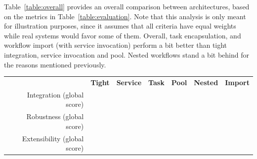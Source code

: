 \documentclass[preprint,3p,twocolumn]{elsarticle}
\newcommand{\note}[2]{\pdfmargincomment[color=yellow,author=#1,open=true]{#2}}
\newcommand{\closednote}[4]{} %
\begin{document}
Table~\ref{table:overall} provides an overall comparison between
architectures, based on the metrics in Table~\ref{table:evaluation}.
Note that this analysis is only meant for illustration purposes, since it
assumes that all criteria have equal weights while real systems would
favor some of them. Overall, task encapsulation, and workflow import (with
service invocation) perform a bit better than tight integration,
service invocation and pool. Nested workflows stand a bit behind for
the reasons mentioned previously.\closednote{Rafael}{I would emphasize
  that this analysis is only for illustration purposes, since it does
  not account for different weights in metrics.}{Tristan}{Done.}
\begin{table}
\footnotesize
\centering
\begin{tabular}{rcccccc}
                                    & \textbf{Tight}
                                    & \textbf{Service}
                                    & \textbf{Task}
                                    & \textbf{Pool}
                                    & \textbf{Nested}
                                    & \textbf{Import} \\
  Integration (global score)    &
                                    \cellcolor[HTML]{99FF99}{0.00}
                                    & \cellcolor[HTML]{99E899}{0.22}
                                    & \cellcolor[HTML]{99FF99}{0.00}
                                    & \cellcolor[HTML]{99D299}{0.44}
                                    & \cellcolor[HTML]{999999}{1.00}
                                      & \cellcolor[HTML]{99DD99}{0.33}\\
Robustness (global score) &
                                \cellcolor[HTML]{99F099}{0.14}
                                    & \cellcolor[HTML]{99D399}{0.43}
                                    & \cellcolor[HTML]{99FF99}{0.00}
                                    & \cellcolor[HTML]{99B699}{0.71}
                                    & \cellcolor[HTML]{999999}{1.00}
                                    & \cellcolor[HTML]{99D399}{0.43}\\
  Extensibility (global score)  & \cellcolor[HTML]{99D299}{0.44}
                                     & \cellcolor[HTML]{99D299}{0.44}
                                     & \cellcolor[HTML]{99FF99}{0.00}
                                     & \cellcolor[HTML]{99E899}{0.22}
                                     & \cellcolor[HTML]{999999}{1.00}
                                     & \cellcolor[HTML]{99E899}{0.22}\\

\end{tabular}
\end{table}
\end{document}
